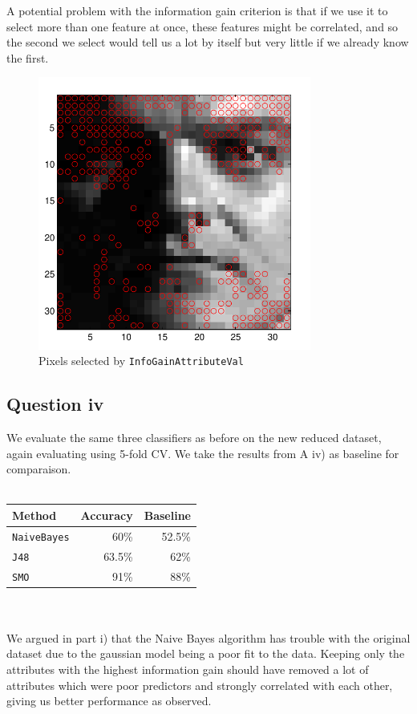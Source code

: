 \documentclass[a4paper]{article}
\begin{document}
A potential problem with the information gain criterion is that if we use it to select more than one feature at once, these features might be correlated, and so the second we select would tell us a lot by itself but very little if we already know the first.

\begin{figure}[!htbp]
\centering
\includegraphics[width=0.8\textwidth]{B3-img1-pixels-cropped.pdf}
\caption{Pixels selected by {\tt InfoGainAttributeVal}}
\label{fig:b3img1}
\end{figure}

\FloatBarrier

\subsection*{Question iv}
We evaluate the same three classifiers as before on the new reduced dataset, again evaluating using 5-fold CV. We take the results from A iv) as baseline for comparaison.\\
\\
\begin{tabular}{lrr}
Method & Accuracy & Baseline \\
\hline
{\tt NaiveBayes} & 60\% & 52.5\% \\
{\tt J48} & 63.5\% & 62\% \\
{\tt SMO} & 91\% & 88\%
\end{tabular}\\
\\
We argued in part i) that the Naive Bayes algorithm has trouble with the original dataset due to the gaussian model being a poor fit to the data. Keeping only the attributes with the highest information gain should have removed a lot of attributes which were poor predictors and strongly correlated with each other, giving us better performance as observed.
\end{document}
